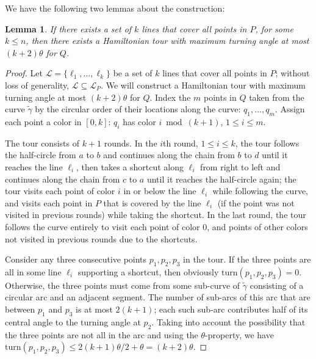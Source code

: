\documentclass[letterpaper,11pt]{article}
\newtheorem{lemma}{Lemma}
\def\L{{\mathcal L}}
\begin{document}
We have the following two lemmas about the construction:

\begin{lemma}\label{lem:hamiltonian-direct}
If there exists a set of $k$ lines that cover all points in $P$,
for some $k \leq n$,
then there exists a Hamiltonian tour with maximum turning angle at most
$(k+2)\theta$ for $Q$.
\end{lemma}

\begin{proof}
Let $\L = \{\ell_1,\ldots,\ell_k\}$
be a set of $k$ lines that cover all points in $P$;
without loss of generality, $\L \subseteq \L_P$.
We will construct a Hamiltonian tour with maximum turning angle at most
$(k+2)\theta$ for $Q$.
Index the $m$ points in $Q$ taken from the curve $\tilde\gamma$
by the circular order of their locations along the curve:
$q_1,\ldots,q_m$.
Assign each point a color in $[0,k]$:
$q_i$ has color $i \bmod (k+1)$, $1 \le i \le m$.

The tour consists of $k+1$ rounds.
In the $i$th round, $1 \le i \le k$,
the tour follows the half-circle from $a$ to $b$ and continues along the
chain from $b$ to $d$ until it reaches the line $\ell_i$,
then takes a shortcut along $\ell_i$ from right to left
and continues along the chain from $c$ to $a$
until it reaches the half-circle again;
the tour visits each point of color $i$
in or below the line $\ell_i$ while following the curve,
and visits each point in $P$ that is covered by the line $\ell_i$
(if the point was not visited in previous rounds)
while taking the shortcut.
In the last round, the tour follows the curve entirely
to visit each point of color $0$,
and points of other colors not visited in previous rounds due to the shortcuts.

Consider any three consecutive points $p_1,p_2,p_3$ in the tour.
If the three points are all in some line $\ell_i$ supporting a shortcut,
then obviously $\mathrm{turn}(p_1,p_2,p_3) = 0$.
Otherwise, the three points must come from some sub-curve of $\tilde\gamma$
consisting of a circular arc and an adjacent segment.
The number of sub-arcs of this arc that are between $p_1$ and $p_3$
is at most $2(k+1)$;
each such sub-arc contributes half of its central angle
to the turning angle at $p_2$.
Taking into account the possibility that
the three points are not all in the arc
and using the $\theta$-property,
we have
$\mathrm{turn}(p_1,p_2,p_3) \le 2(k+1)\theta/2 + \theta = (k+2)\theta$.
\end{proof}
\end{document}
